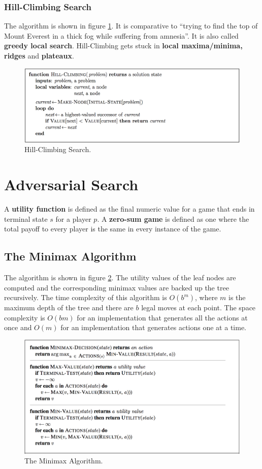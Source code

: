 \documentclass[twoside]{article}
\begin{document}
\subsubsection{Hill-Climbing Search}
The algorithm is shown in figure \ref{fig:hill}. It is comparative to ``trying
to find the top of Mount Everest in a thick fog while suffering from amnesia''.
It is also called \textbf{greedy local search}. Hill-Climbing gets stuck in
\textbf{local maxima/minima, ridges} and \textbf{plateaux}.
\begin{figure}
  \includegraphics[width=\linewidth]{hill.png}
  \caption{Hill-Climbing Search.}
  \label{fig:hill}
\end{figure}
\section{Adversarial Search}
A \textbf{utility function} is defined as the final numeric value for a game
that ends in terminal state \(s\) for a player \(p\). A \textbf{zero-sum game}
is defined as one where the total payoff to every player is the same in 
every instance of the game.
\subsection{The Minimax Algorithm}
The algorithm is shown in figure \ref{fig:minimax}. The utility values of the 
leaf nodes are computed and the corresponding minimax values are backed up
the tree recursively. The time complexity of this algorithm is \(O(b^m)\), where
\(m\) is the maximum depth of the tree and there are \(b\) legal moves at each
point. The space complexity is \(O(bm)\) for an implementation that generates
all the actions at once and \(O(m)\) for an implementation that generates 
actions one at a time.
\begin{figure}
  \includegraphics[width=\linewidth]{minimax.png}
  \caption{The Minimax Algorithm.}
  \label{fig:minimax}
\end{figure}
\end{document}
